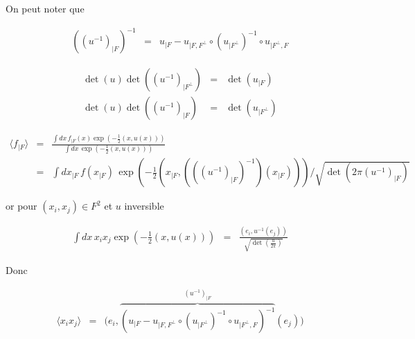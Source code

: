 \begin{aff}
	On peut noter que 

\begin{eqnarray*}
	\left ( \left (u^{-1} \right )_{\vert F} \right )^{-1}  & = & 	u_{\vert F }- u_{\vert F, F^\perp} \circ (u_{\vert F^\perp})^{-1} \circ u_{\vert F^\perp, F}	
\end{eqnarray*}

\begin{eqnarray*}
	\det (u )\det \left( \left (u^{-1} \right )_{\vert F^\perp}  \right) & = & \det \left(u_{\vert F} \right) 	\\
	\det (u )\det \left( \left (u^{-1} \right )_{\vert F}  \right) & = & \det \left(u_{\vert F^\perp} \right)	
\end{eqnarray*}

\begin{eqnarray*}
	\langle f_{\vert F } \rangle  & = & \frac{\int d x \, f_{\vert F}(x) \exp \left ( - \frac{1}{2} ( x , u (x)) \right ) }{\int d x \, \exp \left ( - \frac{1}{2} ( x , u (x)) \right )}\\
	& = & \int d x_{\vert F}  \, f(x_{\vert F}) \, \exp \left ( - \frac{1}{2} \left ( x_{\vert F } , \left ( \left ( \left (u^{-1} \right )_{\vert F} \right )^{-1}  \right ) \left (x_{\vert F } \right ) \right ) \right )/\sqrt{ \det \left( 2\pi \left ( u^{-1} \right )_{\vert F} \right)}
\end{eqnarray*}

	
\end{aff}


or pour $(x_i , x_j)\in F^2$ et $u$ inversible 	

\begin{eqnarray*}
	\int d x  \, x_i x_j \exp \left ( - \frac{1}{2} ( x , u(x)) \right ) & = &  \frac{( e_i , u^{-1}(e_j))}{\sqrt{\det \left (\frac{u}{2\pi}\right ) }} 	
\end{eqnarray*}

Donc 

\begin{eqnarray*}
	\langle x_i x_j \rangle  & = & \Big ( e_i ,\overbrace{\left ( u_{\vert F }- u_{\vert F, F^\perp} \circ (u_{\vert F^\perp})^{-1} \circ u_{\vert F^\perp, F} \right )^{-1}}^{\left (u^{-1} \right )_{\vert F}}  \left (e_j\right ) \Big )
\end{eqnarray*}


